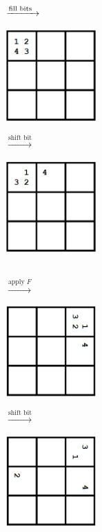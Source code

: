 \begin{figure}[ht]
    \centering
    $\xrightarrow{\text{fill bits\;\;}}$
    \begin{minipage}{0.3\textwidth}
        \centering
        \includegraphics[width=3.5cm]{figures/encryption/bit_start.png}
    \end{minipage}
    $\xrightarrow{\text{shift bit}}$
    \begin{minipage}{0.3\textwidth}
        \centering
        \includegraphics[width=3.5cm]{figures/encryption/bit_shift_one.png}
    \end{minipage}
    \\ $\xrightarrow{\text{apply }F}$
    \begin{minipage}{0.3\textwidth}
        \centering
        \includegraphics[width=3.5cm]{figures/encryption/bit_rotate_one.png}
    \end{minipage}
    $\xrightarrow{\text{shift bit}}$
    \begin{minipage}{0.3\textwidth}
        \centering
        \includegraphics[width=3.5cm]{figures/encryption/bit_shift_two.png}

\end{minipage}
\end{figure}
